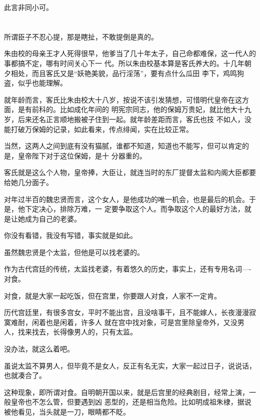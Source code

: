 \documentclass[11pt,a4paper,onecolumn]{article}
\begin{document}
此言非同小可。

\section[\thesection]{}

所谓臣子不忍心提，那是瞎扯，不敢提倒是真的。

朱由校的母亲王才人死得很早，他爹当了几十年太子，自己命都难保，这一代人的事都搞不定，哪有时间关心下一
代。所以朱由校基本算是客氏养大的。十几年朝夕相处，而且客氏又是``妖艳美貌，品行淫荡''，要有点什么瓜田
李下，鸡鸣狗盗，似乎也能理解。

就年龄而言，客氏比朱由校大十八岁，按说不该引发猜想，可惜明代皇帝在这方面，是有前科的。比如成化年间的
明宪宗同志，他的保姆万贵妃，就比他大十九岁，后来还名正言顺地搬被子住到一起。就年龄差距而言，客氏也技
不如人，没能打破万保姆的记录，如此看来，传点绯闻，实在比较正常。

当然，这两人之间到底有没有猫腻，谁都不知道，知道也不能写，但可以肯定的是，皇帝陛下对于这位保姆，是十
分器重的。

客氏就是这么个人物，皇帝捧，大臣让，就连当时的东厂提督太监和内阁大臣都要给她几分面子。

对年过半百的魏忠贤而言，这个女人，是他成功的唯一机会，也是最后的机会。于是，他下定决心，排除万难，一
定要争取这个人。而争取这个人的最好方法，就是让她成为自己的老婆。

你没有看错，我没有写错，事实就是如此。

虽然魏忠贤是个太监，但他是可以找老婆的。

作为古代宫廷的传统，太监找老婆，有着悠久的历史，事实上，还有专用名词----对食。

对食，就是大家一起吃饭，但在宫里，你要跟人对食，人家不一定肯。

历代宫廷里，有很多宫女，平时不能出宫，且没啥事干，且不能嫁人，长夜漫漫寂寞难耐，闲着也是闲着，许多人
就在宫中找对象，可是宫里除皇帝外，又没男人，找来找去，长得像男人的，只有太监。

没办法，就这么着吧。

虽说太监不算男人，但毕竟不是女人，反正有名无实，大家一起过日子，说说话，也就凑合了。

这种现象，即所谓对食。自明朝开国以来，就是后宫里的经典剧目，经常上演，一般皇帝也不怎么管，但要遇到凶
恶型的，还是相当危险。比如明成祖朱棣，据说被他看见，当头就是一刀，眼睛都不眨。

\section[\thesection]{}
\end{document}
